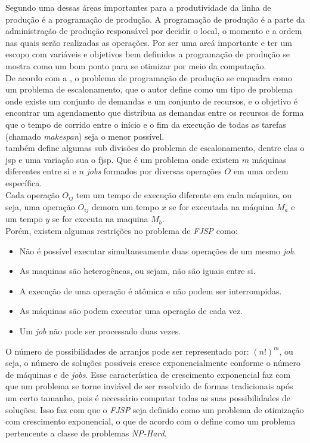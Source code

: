 \indent Segundo \citeauthor{Xhafa2008} uma dessas áreas importantes para a produtividade da linha de produção é a programação de produção. 
A programação de produção é a parte da administração de produção responsável por decidir o local, o momento e a ordem nas quais serão realizadas as operações. 
Por ser uma areá importante e ter um escopo com variáveis e objetivos bem definidos a programação de produção se mostra como um bom ponto para se otimizar por meio da computação.\\
\indent De acordo com a \citeauthor{Bagchi1999}, o problema de programação de produção se enquadra como um problema de escalonamento, que o autor define como um tipo de problema onde existe um conjunto de demandas e um conjunto de recursos, e o objetivo é encontrar um agendamento que distribua as demandas entre os recursos de forma que o tempo de corrido entre o início e o fim da execução de todas as tarefas (chamado \textit{makespan}) seja o menor possível.\\
\indent \citeauthor{Bagchi1999} também define algumas sub divisões do problema de escalonamento, dentre elas o \gls{jsp} e uma variação sua o \gls{fjsp}. 
Que é um problema onde existem $m$ máquinas diferentes entre si e $n$ \textit{jobs} formados por diversas operações $O$ em uma ordem específica.\\
Cada operação $O_{ij}$ tem um tempo de execução diferente em cada máquina, ou seja, uma operação 
$O_{ij}$ demora um tempo $x$ se for executada na máquina $M_a$ e um tempo $y$ se for executa na maquina $M_b$.\\
Porém, existem algumas restrições no problema de \textit{FJSP} como:
\begin{itemize}
    \item Não é possível executar simultaneamente duas operações de um mesmo \textit{job}.
    \item As maquinas são heterogêneas, ou sejam, não são iguais entre si.
    \item A execução de uma operação é atômica e não podem ser interrompidas.
    \item As máquinas são podem executar uma operação de cada vez.
    \item Um \textit{job} não pode ser processado duas vezes.
\end{itemize}

O número de possibilidades de arranjos pode ser representado por: $(n!)^m$, ou seja, o número de soluções possíveis cresce exponencialmente conforme o número de máquinas e de \textit{jobs}.
Esse característica de crescimento exponencial faz com que um problema se torne inviável de ser resolvido de formas tradicionais após um certo tamanho, pois é necessário computar todas as suas possibilidades de soluções.
Isso faz com que o \textit{FJSP} seja definido como um problema de otimização com crescimento exponencial, o que de acordo com \citeauthor{Eswaramurthy2008} o define como um problema pertencente a classe de problemas \textit{NP-Hard}.\hfill

